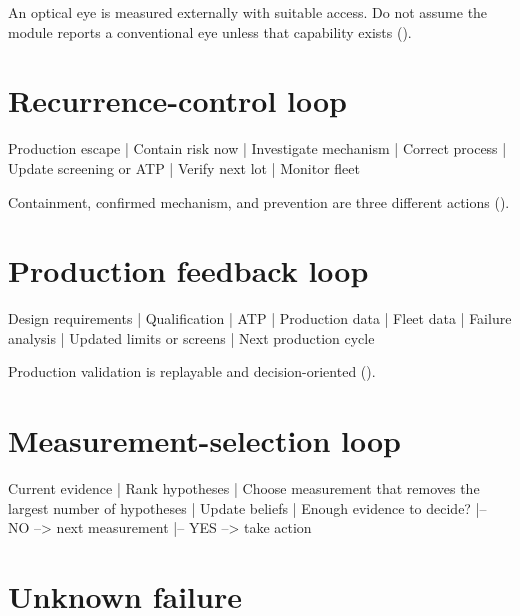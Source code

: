 An optical eye is measured externally with suitable access. Do not assume the
module reports a conventional eye unless that capability exists
().

\section{Recurrence-control loop}
\label{sec:tree-recurrence}

\begin{dectree}
Production escape
  |
Contain risk now
  |
Investigate mechanism
  |
Correct process
  |
Update screening or ATP
  |
Verify next lot
  |
Monitor fleet
\end{dectree}

Containment, confirmed mechanism, and prevention are three different actions
().

\section{Production feedback loop}
\label{sec:tree-production-loop}

\begin{dectree}
Design requirements
  |
Qualification
  |
ATP
  |
Production data
  |
Fleet data
  |
Failure analysis
  |
Updated limits or screens
  |
Next production cycle
\end{dectree}

Production validation is replayable and decision-oriented
().

\section{Measurement-selection loop}
\label{sec:tree-measurement-loop}

\begin{dectree}
Current evidence
  |
Rank hypotheses
  |
Choose measurement that removes
the largest number of hypotheses
  |
Update beliefs
  |
Enough evidence to decide?
  |-- NO  --> next measurement
  |-- YES --> take action
\end{dectree}


\section{Unknown failure}
\label{sec:tree-unknown}

